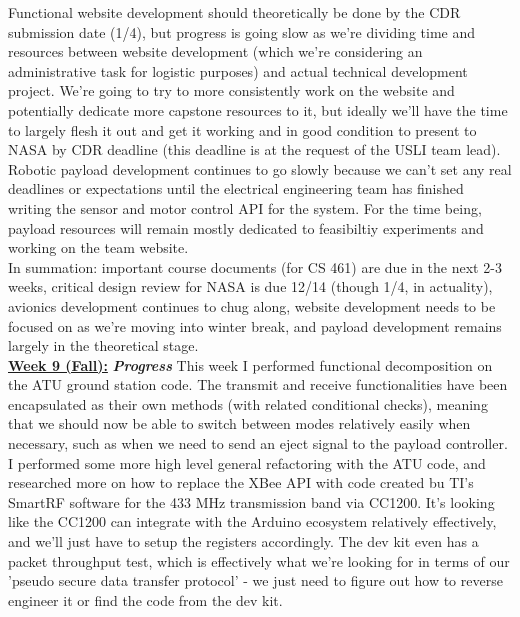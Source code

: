 \documentclass[onecolumn, draftclsnofoot, 10pt, compsoc]{IEEEtran}
\begin{document}
Functional website development should theoretically be done by the CDR submission date (1/4), but progress
is going slow as we're dividing time and resources between website development (which we're considering 
an administrative task for logistic purposes) and actual technical development project. We're going to
try to more consistently work on the website and potentially dedicate more capstone resources to it, but
ideally we'll have the time to largely flesh it out and get it working and in good condition to present
to NASA by CDR deadline (this deadline is at the request of the USLI team lead). \\

Robotic payload development continues to go slowly because we can't set any real deadlines or expectations
until the electrical engineering team has finished writing the sensor and motor control API for the system.
For the time being, payload resources will remain mostly dedicated to feasibiltiy experiments and working
on the team website. \\

In summation: important course documents (for CS 461) are due in the next 2-3 weeks, critical design
review for NASA is due 12/14 (though 1/4, in actuality), avionics development continues to chug along,
website development needs to be focused on as we're moving into winter break, and payload development
remains largely in the theoretical stage. \\

\underline{\textbf{Week 9 (Fall):}}
\newline\textbf{\textit{{Progress}}}
\newline This week I performed functional decomposition on the ATU ground station code. The transmit and receive
functionalities have been encapsulated as their own methods (with related conditional checks), meaning that
we should now be able to switch between modes relatively easily when necessary, such as when we need to
send an eject signal to the payload controller. \\

I performed some more high level general refactoring with the ATU code, and researched more on how to
replace the XBee API with code created bu TI's SmartRF software for the 433 MHz transmission band via CC1200.
It's looking like the CC1200 can integrate with the Arduino ecosystem relatively effectively, and we'll just
have to setup the registers accordingly. The dev kit even has a packet throughput test, which is effectively
what we're looking for in terms of our 'pseudo secure data transfer protocol' - we just need to figure out
how to reverse engineer it or find the code from the dev kit. \\
\end{document}
